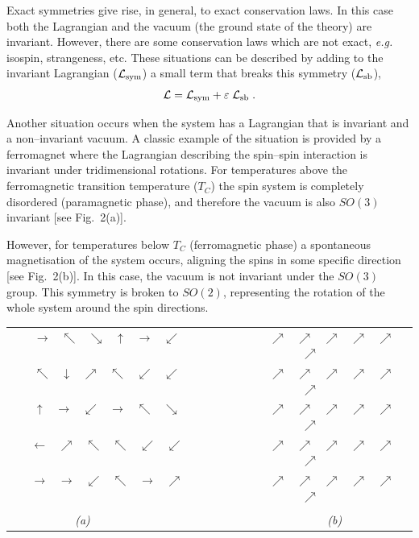 \documentclass[12pt]{report}
\def\text#1{{\scriptstyle\mathrm{#1}}}
\newcommand{\lag}{{\cal L}}
\newcommand{\rar}{$\longrightarrow$}
\newcommand{\lar}{$\longleftarrow$}
\newcommand{\uar}{$\uparrow$}
\newcommand{\dar}{$\downarrow$}
\newcommand{\ner}{$\nearrow$}
\newcommand{\nor}{$\nwarrow$}
\newcommand{\ser}{$\searrow$}
\newcommand{\sor}{$\swarrow$}
\begin{document}
Exact symmetries give rise, in general, to exact conservation laws.
In this case both the Lagrangian and the vacuum (the ground state of
the theory) are invariant. However, there are some conservation laws
which are not exact, {\it e.g.} isospin, strangeness, etc.  These
situations can be  described by adding to the invariant Lagrangian
($\lag_{\text{sym}}$) a small term that breaks this symmetry
($\lag_{\text{sb}}$),
\[
\lag = \lag_{\text{sym}} + \varepsilon \; \lag_{\text{sb}} \; .
\]

Another situation occurs when the system has a Lagrangian that is
invariant and a non--invariant vacuum. A classic example of
the situation is provided by a ferromagnet where the Lagrangian
describing the spin--spin interaction is invariant under
tridimensional rotations. For temperatures above the ferromagnetic 
transition temperature ($T_C$) the spin system is completely
disordered (paramagnetic phase), and therefore the vacuum is also
$SO(3)$ invariant [see Fig.\ 2(a)]. 

However, for temperatures below $T_C$ (ferromagnetic phase)  a 
spontaneous magnetisation of the system occurs, aligning the spins in
some specific direction [see Fig.\ 2(b)]. In this case, the vacuum is
not invariant under the $SO(3)$ group. This symmetry is broken to
$SO(2)$, representing the rotation of the whole system around the
spin directions.

\vskip 0.3cm
\begin{center}
\begin{tabular}{cc}
{ \rar ~ \nor ~ \ser ~ \uar ~ \rar ~ \sor } ~~~~~~~~ & ~~~~~~~~ 
{ \ner ~ \ner ~ \ner ~ \ner ~ \ner ~ \ner }\\[0.2cm]
{ \nor ~ \dar ~ \ner ~ \nor ~ \sor ~ \sor }~~~~~~~~ & ~~~~~~~~ 
{ \ner ~ \ner ~ \ner ~ \ner ~ \ner ~ \ner }\\[0.2cm]
{ \uar ~ \rar ~ \sor ~ \rar ~ \nor ~ \ser }~~~~~~~~ & ~~~~~~~~  
{ \ner ~ \ner ~ \ner ~ \ner ~ \ner ~ \ner }\\[0.2cm]
{ \lar ~ \ner ~ \nor ~ \nor ~ \sor ~ \sor }~~~~~~~~ & ~~~~~~~~  
{ \ner ~ \ner ~ \ner ~ \ner ~ \ner ~ \ner }\\[0.2cm]
{ \rar ~ \rar ~ \sor ~ \nor ~ \rar ~ \ner }~~~~~~~~ & ~~~~~~~~ 
{ \ner ~ \ner ~ \ner ~ \ner ~ \ner ~ \ner }\\[0.2cm]
& \\
{\it (a)} ~~~~~~~~&~~~~~~~~ {\it (b)} \\
\end{tabular}
\end{center}
\end{document}
